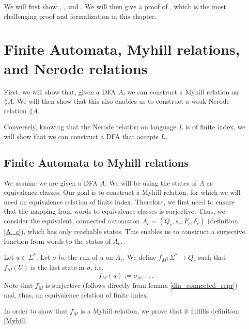 We will first show , , and .
We will then give a proof of , which is the most challenging proof and formalization in this chapter.


\section{Finite Automata, Myhill relations, and Nerode relations}
First, we will show that, given a DFA $A$, we can construct a Myhill relation on $\lang{A}$.
We will then show that this also enables us to construct a weak Nerode relation $\lang{A}$.

Conversely, knowing that the Nerode relation on language $L$ is of finite index,  we will show that we can construct a DFA that accepts $L$.

\subsection{Finite Automata to Myhill relations}
We assume we are given a DFA $A$. 
We will be using the states of $A$ as equivalence classes.
Our goal is to construct a Myhill relation, for which we will need an equivalence relation of finite index.
Therefore, we first need to ensure that the mapping from words to equivalence classes is surjective.
Thus, we consider the equivalent, connected automaton $A_c=(Q_c, s_c, F_c, \delta_c)$ (definition \ref{A_c}), which has only reachable states.
This enables us to construct a surjective function from words to the states of $A_c$.

\begin{definition}
    \label{f_M} 
    Let $u \in \Sigma^*$. 
    Let $\sigma$ be the run of $u$ on $A_c$. 
    We define $f_M: \Sigma^* \mapsto Q_c$ such that $f_M(U)$ is the last state in $\sigma$, i.e.
    \begin{equation*}
        f_M(u) := \sigma_{|\sigma|-1}.
    \end{equation*}
    Note that $f_M$ is surjective (follows directly from lemma \ref{dfa_connected_repr}) 
    and, thus, an equivalence relation of finite index.
\end{definition}



In order to show that $f_M$ is a Myhill relation, we prove that it fulfills definition \ref{Myhill}.

